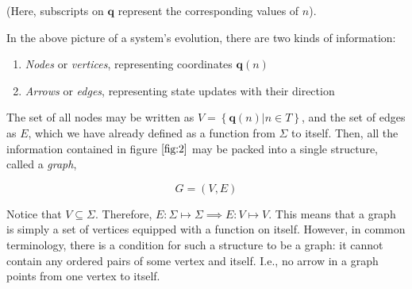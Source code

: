 \documentclass[12 pt]{article}
\begin{document}
(Here, subscripts on $\pmb{q}$ represent the corresponding values of $n$).

In the above picture of a system's evolution, there are two kinds of information:

\begin{enumerate}
  \item \emph{Nodes} or \emph{vertices}, representing coordinates $\pmb{q} \left( n \right)$

  \item \emph{Arrows} or \emph{edges}, representing state updates with their direction
\end{enumerate}

The set of all nodes may be written as $V = \left\{ \pmb{q} \left( n \right) \vert n \in T \right\}$, and the set of edges as $E$, which we have already defined as a function from $\Sigma$ to itself. Then, all the information contained in figure $\ref{fig:2}$ may be packed into a single structure, called a \emph{graph},

$$G = \left( V, E \right)$$

Notice that $V \subseteq \Sigma$. Therefore, $E : \Sigma \mapsto \Sigma \implies E : V \mapsto V$. This means that a graph is simply a set of vertices equipped with a function on itself. However, in common terminology, there is a condition for such a structure to be a graph: it cannot contain any ordered pairs of some vertex and itself. I.e., no arrow in a graph points from one vertex to itself.
\end{document}
